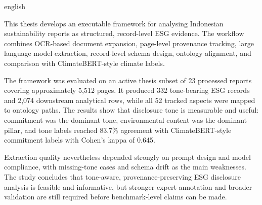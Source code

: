 
\begin{thesisabstract}{english}
  \abstractmetadata

This thesis develops an executable framework for analysing Indonesian
sustainability reports as structured, record-level ESG evidence. The workflow
combines OCR-based document expansion, page-level provenance tracking, large
language model extraction, record-level schema design, ontology alignment, and
comparison with ClimateBERT-style climate labels.

The framework was evaluated on an active thesis subset of 23 processed reports
covering approximately 5,512 pages. It produced 332 tone-bearing ESG records
and 2,074 downstream analytical rows, while all 52 tracked aspects were mapped
to ontology paths. The results show that disclosure tone is measurable and
useful: commitment was the dominant tone, environmental content was the
dominant pillar, and tone labels reached 83.7\% agreement with
ClimateBERT-style commitment labels with Cohen's kappa of 0.645.

Extraction quality nevertheless depended strongly on prompt design and model
compliance, with missing-tone cases and schema drift as the main weaknesses.
The study concludes that tone-aware, provenance-preserving ESG disclosure
analysis is feasible and informative, but stronger expert annotation and
broader validation are still required before benchmark-level claims can be
made.
\end{thesisabstract}

